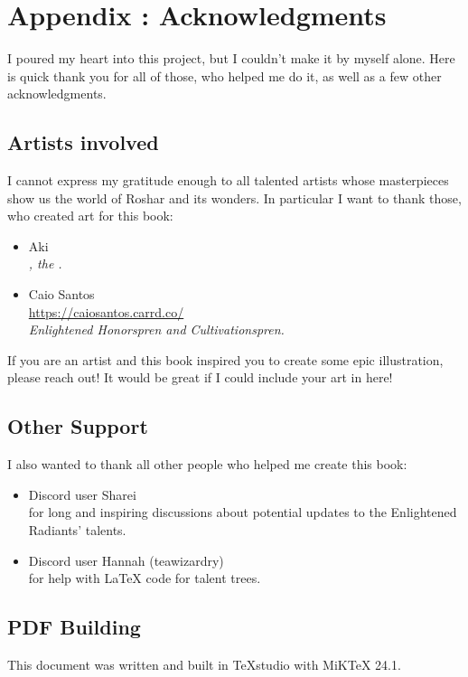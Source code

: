 \chapter{Appendix \thechapter{}: Acknowledgments}
\label{chap:acknowledgments}

I poured my heart into this project, but I couldn't make it by myself alone. Here is quick thank you for all of those, who helped me do it, as well as a few other acknowledgments. 

\section{Artists involved}

I cannot express my gratitude enough to all talented artists whose masterpieces show us the world of Roshar and its wonders. In particular I want to thank those, who created art for this book:

\begin{itemize}
	\item Aki \\
	\textit{\npcSjaAnat{}, the \npcSjaAnatTitle{}.}
	
	\item Caio Santos \\
	\url{https://caiosantos.carrd.co/} \\
	\textit{Enlightened Honorspren and Cultivationspren.}
\end{itemize}

If you are an artist and this book inspired you to create some epic illustration, please reach out! It would be great if I could include your art in here!

\section{Other Support}

I also wanted to thank all other people who helped me create this book:

\begin{itemize}
	\item Discord user Sharei \\
	for long and inspiring discussions about potential updates to the Enlightened Radiants' talents.
	
	\item Discord user Hannah (teawizardry)\\
	 for help with LaTeX code for talent trees. 
\end{itemize}


\section{PDF Building} 

This document was written and built in TeXstudio with MiKTeX 24.1.

